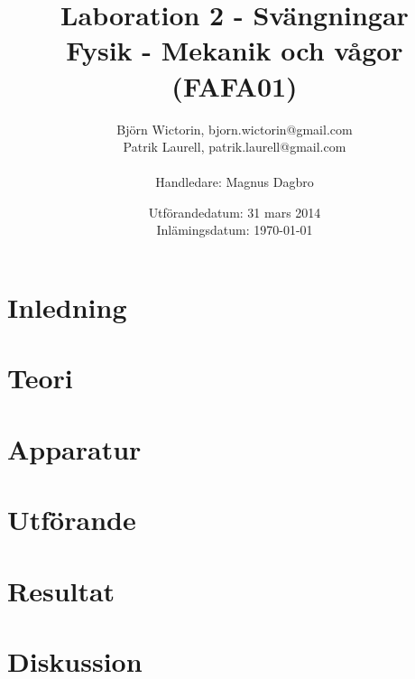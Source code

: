 \documentclass[a4paper,10pt]{article}
\title{Laboration 2 - Svängningar \\ Fysik - Mekanik och vågor (FAFA01)}
\author{Björn Wictorin, bjorn.wictorin@gmail.com \\ Patrik Laurell, patrik.laurell@gmail.com \\ \\ Handledare: Magnus Dagbro}
\date{Utförandedatum: 31 mars 2014 \\ Inlämingsdatum: \today}
\begin{document}
\maketitle
\thispagestyle{empty}
\newpage
{}
\tableofcontents{}
\pagebreak
{}

\section{Inledning}


\section{Teori}

\makeindex

\section{Apparatur}

\section{Utförande}

\section{Resultat}

\section{Diskussion}
\end{document}
